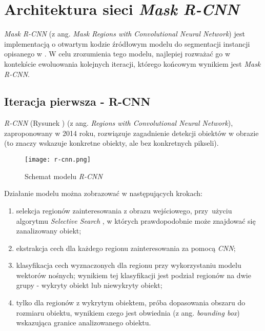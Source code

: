 \section{Architektura sieci \textit{Mask R-CNN}}
\label{sec:architekrura_mask_rcnn}

\textit{Mask R-CNN} \cite{matterport-mask-rcnn} (z ang. \textit{Mask Regions with Convolutional Neural Network}) jest implementacją o otwartym kodzie źródłowym modelu do segmentacji instancji opisanego w \cite{general-mask-rcnn}.
W celu zrozumienia tego modelu, najlepiej rozważać go w kontekście ewoluowania kolejnych iteracji, którego końcowym wynikiem jest \textit{Mask R-CNN}.

\subsection{Iteracja pierwsza - R-CNN}

\textit{R-CNN} \cite{rcnn} (Rysunek ) (z ang. \textit{Regions with Convolutional Neural Network}), zaproponowany w 2014 roku, rozwiązuje zagadnienie detekcji obiektów w obrazie (to znaczy wskazuje konkretne obiekty, ale bez konkretnych pikseli).

\begin{figure}[h]
  \centering
  \texttt{[image: r-cnn.png]}
  \caption{Schemat modelu \textit{R-CNN}}
  \label{fig:r_cnn}
\end{figure}

Działanie modelu można zobrazować w następujących krokach:
\label{sec:regiony}
\begin{enumerate}
  \item selekcja regionów zainteresowania z obrazu wejściowego, przy~użyciu algorytmu \textit{Selective Search} \cite{selective-search}, w których prawdopodobnie może znajdować się zanalizowany obiekt;
  \item ekstrakcja cech dla każdego regionu zainteresowania za pomocą \textit{CNN};
  \item klasyfikacja cech wyznaczonych dla regionu przy wykorzystaniu modelu wektorów nośnych; wynikiem tej klasyfikacji jest podział regionów na dwie grupy - wykryty obiekt lub niewykryty obiekt;
  \item tylko dla regionów z wykrytym obiektem, próba dopasowania obszaru do rozmiaru obiektu, wynikiem czego jest obwiednia (z ang. \textit{bounding box}) wskazująca granice analizowanego obiektu.
\end{enumerate}

